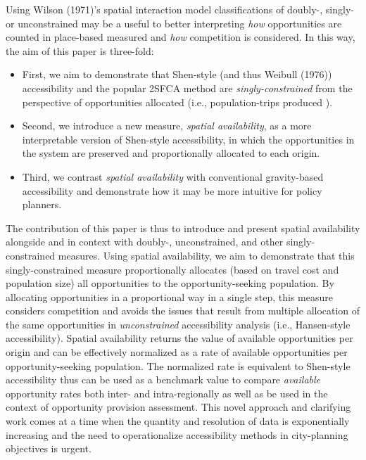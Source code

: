 \documentclass[]{elsarticle} %
\providecommand{\tightlist}{%
  \setlength{\itemsep}{0pt}\setlength{\parskip}{0pt}}
\begin{document}
Using Wilson (1971)'s spatial interaction model classifications of
doubly-, singly- or unconstrained may be a useful to better interpreting
\emph{how} opportunities are counted in place-based measured and
\emph{how} competition is considered. In this way, the aim of this paper
is three-fold:

\begin{itemize}
\tightlist
\item
  First, we aim to demonstrate that Shen-style (and thus Weibull (1976))
  accessibility and the popular 2SFCA method are
  \emph{singly-constrained} from the perspective of opportunities
  allocated (i.e., population-trips produced ).
\item
  Second, we introduce a new measure, \emph{spatial availability}, as a
  more interpretable version of Shen-style accessibility, in which the
  opportunities in the system are preserved and proportionally allocated
  to each origin.
\item
  Third, we contrast \emph{spatial availability} with conventional
  gravity-based accessibility and demonstrate how it may be more
  intuitive for policy planners.
\end{itemize}

The contribution of this paper is thus to introduce and present spatial
availability alongside and in context with doubly-, unconstrained, and
other singly- constrained measures. Using spatial availability, we aim
to demonstrate that this singly-constrained measure proportionally
allocates (based on travel cost and population size) all opportunities
to the opportunity-seeking population. By allocating opportunities in a
proportional way in a single step, this measure considers competition
and avoids the issues that result from multiple allocation of the same
opportunities in \emph{unconstrained} accessibility analysis (i.e.,
Hansen-style accessibility). Spatial availability returns the value of
available opportunities per origin and can be effectively normalized as
a rate of available opportunities per opportunity-seeking population.
The normalized rate is equivalent to Shen-style accessibility thus can
be used as a benchmark value to compare \emph{available} opportunity
rates both inter- and intra-regionally as well as be used in the context
of opportunity provision assessment. This novel approach and clarifying
work comes at a time when the quantity and resolution of data is
exponentially increasing and the need to operationalize accessibility
methods in city-planning objectives is urgent.
\end{document}
